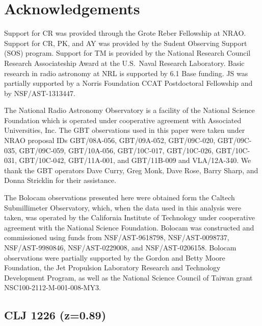 \documentclass[iop,numberedappendix,apj]{emulateapj}
\begin{document}
\section*{Acknowledgements}

Support for CR was provided through the Grote Reber Fellowship at NRAO. Support for CR, PK, and AY was 
provided by the Sudent Observing Support (SOS) program. Support for TM is provided by the National Research 
Council Research Associateship Award at the U.S.\ Naval Research Laboratory. Basic research in radio 
astronomy at NRL is supported by 6.1 Base funding. JS was partially supported by a
Norris Foundation CCAT Postdoctoral Fellowship and by NSF/AST-1313447.

The National Radio Astronomy Observatory is a facility of the National Science Foundation which is operated
under cooperative agreement with Associated Universities, Inc. The GBT observations used in this paper were
taken under NRAO proposal IDs GBT/08A-056, GBT/09A-052, GBT/09C-020, GBT/09C-035, GBT/09C-059, GBT/10A-056, 
GBT/10C-017, GBT/10C-026, GBT/10C-031, GBT/10C-042, GBT/11A-001, and GBT/11B-009 and VLA/12A-340.
We  thank the GBT operators Dave Curry, Greg Monk, Dave Rose, Barry Sharp, and Donna Stricklin for their
assistance. 

The Bolocam observations presented here were obtained form the Caltech Submillimeter Observatory, which,
when the data used in this analysis were taken, was operated by the California Institute of Technology under
cooperative agreement with the National Science Foundation. Bolocam was constructed and commissioned using funds
from NSF/AST-9618798, NSF/AST-0098737, NSF/AST-9980846, NSF/AST-0229008, and NSF/AST-0206158. Bolocam observations
were partially supported by the Gordon and Betty Moore Foundation, the Jet Propulsion Laboratory Research and
Technology Development Program, as well as the National Science Council of Taiwan grant NSC100-2112-M-001-008-MY3.



\appendix


\subsection{CLJ 1226 (z=0.89)}
\label{sec:results_clj1226}
\end{document}
